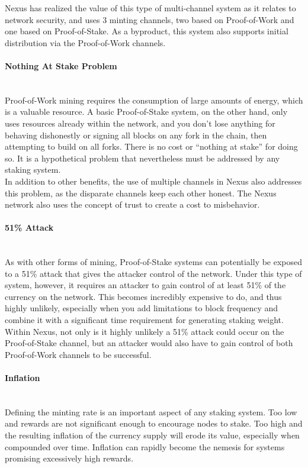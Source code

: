 \documentclass[11pt]{article}
\begin{document}
\noindent Nexus has realized the value of this type of multi-channel system as it relates to network security, and uses 3 minting channels, two based on Proof-of-Work and one based on Proof-of-Stake. As a byproduct, this system also supports initial distribution via the Proof-of-Work channels.

\paragraph{Nothing At Stake Problem} ~\\
Proof-of-Work mining requires the consumption of large amounts of energy, which is a valuable resource. A basic Proof-of-Stake system, on the other hand, only uses resources already within the network, and you don’t lose anything for behaving dishonestly or signing all blocks on any fork in the chain, then attempting to build on all forks. There is no cost or “nothing at stake” for doing so. It is a hypothetical problem that nevertheless must be addressed by any staking system.\\

\noindent In addition to other benefits, the use of multiple channels in Nexus also addresses this problem, as the disparate channels keep each other honest. The Nexus network also uses the concept of trust to create a cost to misbehavior. 

\paragraph{51\% Attack} ~\\
As with other forms of mining, Proof-of-Stake systems can potentially be exposed to a 51\% attack that gives the attacker control of the network. Under this type of system, however, it requires an attacker to gain control of at least 51\% of the currency on the network. This becomes incredibly expensive to do, and thus highly unlikely, especially when you add limitations to block frequency and combine it with a significant time requirement for generating staking weight.\\

\noindent Within Nexus, not only is it highly unlikely a 51\% attack could occur on the Proof-of-Stake channel, but an attacker would also have to gain control of both Proof-of-Work channels to be successful. \\

\paragraph{Inflation} ~\\
Defining the minting rate is an important aspect of any staking system. Too low and rewards are not significant enough to encourage nodes to stake. Too high and the resulting inflation of the currency supply will erode its value, especially when compounded over time. Inflation can rapidly become the nemesis for systems promising excessively high rewards. \\
\end{document}
